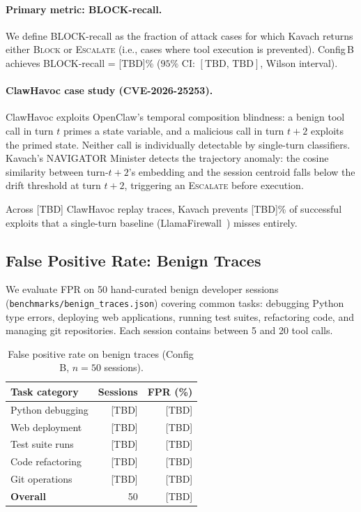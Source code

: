 \paragraph{Primary metric: BLOCK-recall.}
We define BLOCK-recall as the fraction of attack cases for which Kavach returns
either \textsc{Block} or \textsc{Escalate} (i.e., cases where tool execution
is prevented). Config\,B achieves BLOCK-recall = [TBD]\% ($95\%$ CI:
$[\text{TBD},\, \text{TBD}]$, Wilson interval).

\paragraph{ClawHavoc case study (CVE-2026-25253).}
ClawHavoc exploits OpenClaw's temporal composition blindness: a benign tool
call in turn $t$ primes a state variable, and a malicious call in turn $t+2$
exploits the primed state. Neither call is individually detectable by
single-turn classifiers. Kavach's NAVIGATOR Minister detects the trajectory
anomaly: the cosine similarity between turn-$t+2$'s embedding and the session
centroid falls below the drift threshold at turn $t+2$, triggering an
\textsc{Escalate} before execution.

Across [TBD] ClawHavoc replay traces, Kavach prevents [TBD]\% of successful
exploits that a single-turn baseline (LlamaFirewall~\cite{saxe2025llamafirewall})
misses entirely.

\subsection{False Positive Rate: Benign Traces}

We evaluate FPR on 50 hand-curated benign developer sessions
(\texttt{benchmarks/benign\_traces.json}) covering common tasks: debugging
Python type errors, deploying web applications, running test suites,
refactoring code, and managing git repositories. Each session contains
between 5 and 20 tool calls.

\begin{table}[h]
\centering
\caption{False positive rate on benign traces (Config\,B, $n=50$ sessions).}
\label{tab:benign}
\begin{tabular}{lrr}
\toprule
Task category & Sessions & FPR (\%) \\
\midrule
Python debugging     & [TBD] & [TBD] \\
Web deployment       & [TBD] & [TBD] \\
Test suite runs      & [TBD] & [TBD] \\
Code refactoring     & [TBD] & [TBD] \\
Git operations       & [TBD] & [TBD] \\
\midrule
\textbf{Overall}     & 50    & [TBD] \\
\bottomrule
\end{tabular}
\end{table}

